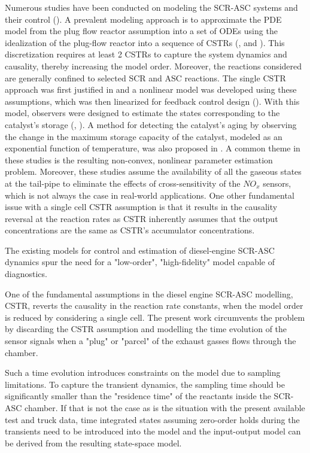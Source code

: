 Numerous studies have been conducted on modeling the SCR-ASC systems and their control (\cite{yuan2015diesel}). A
prevalent modeling approach is to approximate the PDE model from the plug flow reactor assumption into a set of ODEs
using the idealization of the plug-flow reactor into a sequence of CSTRs (\cite{hsieh2011development}, and
\cite{nova2014urea}). This discretization requires at least 2 CSTRs to capture the system dynamics and causality,
thereby increasing the model order. Moreover, the reactions considered are generally confined to selected SCR and ASC
reactions. The single CSTR approach was first justified in \cite{devarakonda2008adequacy} and a nonlinear model was
developed using these assumptions, which was then linearized for feedback control design (\cite{devarakonda2009model}).
With this model, observers were designed to estimate the states corresponding to the catalyst's storage
(\cite{ma2017observer}, \cite{jain2020term}). A method for detecting the catalyst's aging by observing the change in the
maximum storage capacity of the catalyst, modeled as an exponential function of temperature, was also proposed in
\cite{ma2017observer}. A common theme in these studies is the resulting non-convex, nonlinear parameter estimation
problem. Moreover, these studies assume the availability of all the gaseous states at the tail-pipe to eliminate the
effects of cross-sensitivity of the $NO_x$ sensors, which is not always the case in real-world applications. One other
fundamental issue with a single cell CSTR assumption is that it results in the causality reversal at the reaction rates
as CSTR inherently assumes that the output concentrations are the same as CSTR's accumulator concentrations.


The existing models for control and estimation of diesel-engine SCR-ASC dynamics spur the need for a "low-order",
"high-fidelity" model capable of diagnostics.

One of the fundamental assumptions in the diesel engine SCR-ASC modelling, CSTR, reverts the causality in the reaction
rate constants, when the model order is reduced by considering a single cell. The present work circumvents the problem
by discarding the CSTR assumption and modelling the time evolution of the sensor signals when a "plug" or "parcel" of
the exhaust gasses flows through the chamber.

Such a time evolution introduces constraints on the model due to sampling limitations. To capture the transient
dynamics, the sampling time should be significantly smaller than the "residence time" of the reactants inside the
SCR-ASC chamber. If that is not the case as is the situation with the present available test and truck data, time integrated states assuming zero-order holds during the transients need to be introduced into the model and the input-output model can be derived from the resulting state-space model.

